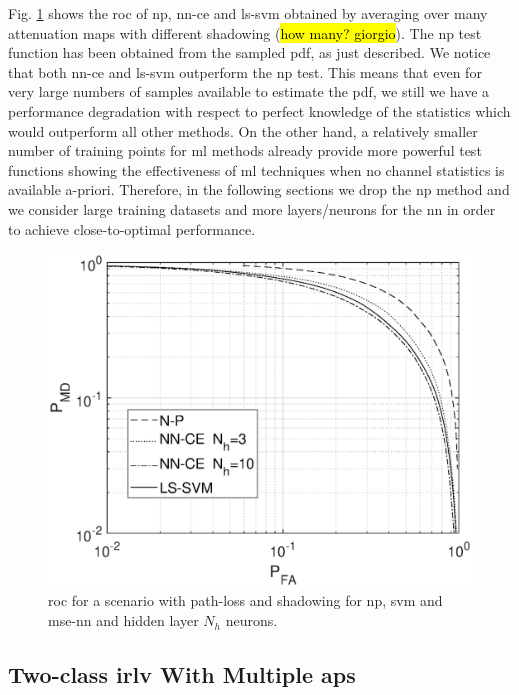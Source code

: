 \documentclass[draftcls,onecolumn,12pt]{IEEEtran}
\begin{document}
Fig. \ref{fig:trueMap} shows the \ac{roc}  of \ac{np}, \ac{nn}-\ac{ce} and \ac{ls}-\ac{svm} obtained by averaging over many attenuation maps with different shadowing (\hl{how many? giorgio}). The \ac{np} test function has been obtained from the sampled \ac{pdf}, as just described. We notice that both \ac{nn}-\ac{ce} and \ac{ls}-\ac{svm} outperform the \ac{np} test. This means that even for very large numbers of samples available to estimate the \ac{pdf}, we still we have a performance degradation with respect to perfect knowledge of the statistics which would outperform all other methods. On the other hand, a relatively smaller number of training points for \ac{ml} methods already provide more powerful test functions showing the effectiveness of \ac{ml} techniques when no channel statistics is available a-priori. Therefore, in the following sections we drop the \ac{np} method and we consider large training datasets and more layers/neurons for the \ac{nn} in order to achieve close-to-optimal performance.
 
\begin{figure}[t]
    \centering
    \includegraphics[width=0.6\columnwidth]{res_NP_approx_SVM.eps}
    \caption{\ac{roc} for a scenario with path-loss and shadowing for \ac{np}, \ac{svm} and \ac{mse}-\ac{nn} and hidden layer $N_h$ neurons.}
    \label{fig:trueMap}
\end{figure}


\subsection{Two-class \ac{irlv} With Multiple \acp{ap}}
\label{sec:res_fading}
\end{document}

